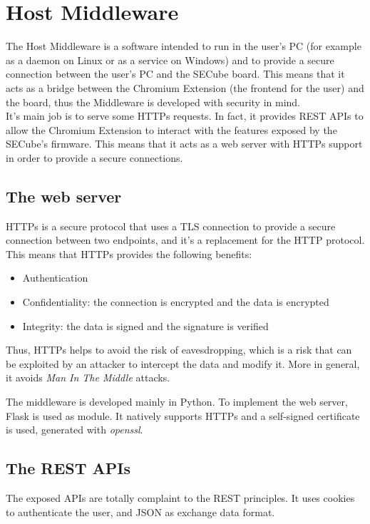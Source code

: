\section{Host Middleware}

The Host Middleware is a software intended to run in the user's PC (for example as a daemon on Linux or as a service on Windows) and to provide a secure connection between the user's PC and the SECube board. This means that it acts as a bridge between the Chromium Extension (the frontend for the user) and the board, thus the Middleware is developed with security in mind.\\

It's main job is to serve some HTTPs requests. In fact, it provides REST APIs to allow the Chromium Extension to interact with the features exposed by the SECube's firmware. This means that it acts as a web server with HTTPs support in order to provide a secure connections.

\subsection{The web server}
HTTPs is a secure protocol that uses a TLS connection to provide a secure connection between two endpoints, and it's a replacement for the HTTP protocol. This means that HTTPs provides the following benefits:

\begin{itemize}
    \item Authentication
    \item Confidentiality: the connection is encrypted and the data is encrypted
    \item Integrity: the data is signed and the signature is verified
\end{itemize}

Thus, HTTPs helps to avoid the risk of eavesdropping, which is a risk that can be exploited by an attacker to intercept the data and modify it. More in general, it avoids \textit{Man In The Middle} attacks. 

The middleware is developed mainly in Python. To implement the web server, Flask is used as module. It natively supports HTTPs and a self-signed certificate is used, generated with \textit{openssl}.\\

\subsection{The REST APIs}
The exposed APIs are totally complaint to the REST principles. It uses cookies to authenticate the user, and JSON as exchange data format. \\

